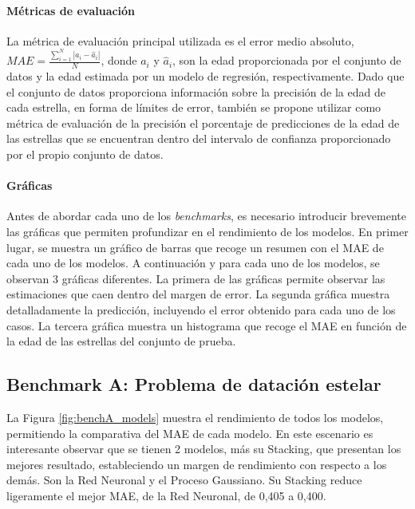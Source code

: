 \paragraph{Métricas de evaluación}
La métrica de evaluación principal utilizada es el error medio absoluto, $MAE = \frac{\sum_{i=1}^{N}|a_i-\hat{a}_i|}{N}$, donde $a_i$ y $\hat{a}_i$, son la edad proporcionada por el conjunto de datos y la edad estimada por un modelo de regresión, respectivamente. Dado que el conjunto de datos proporciona información sobre la precisión de la edad de cada estrella, en forma de límites de error, también se propone utilizar como métrica de evaluación de la precisión el porcentaje de predicciones de la edad de las estrellas que se encuentran dentro del intervalo de confianza proporcionado por el propio conjunto de datos.

\paragraph{Gráficas}
Antes de abordar cada uno de los \emph{benchmarks}, es necesario introducir brevemente las gráficas que permiten profundizar en el rendimiento de los modelos. En primer lugar, se muestra un gráfico de barras que recoge un resumen con el MAE de cada uno de los modelos. A continuación y para cada uno de los modelos, se observan 3 gráficas diferentes. La primera de las gráficas permite observar las estimaciones que caen dentro del margen de error. La segunda gráfica muestra detalladamente la predicción, incluyendo el error obtenido para cada uno de los casos. La tercera gráfica muestra un histograma que recoge el MAE en función de la edad de las estrellas del conjunto de prueba.

\subsection{Benchmark A: Problema de datación estelar}

La Figura \ref{fig:benchA_models} muestra el rendimiento de todos los modelos, permitiendo la comparativa del MAE de cada modelo. En este escenario es interesante observar que se tienen 2 modelos, más su Stacking, que presentan los mejores resultado, estableciendo un margen de rendimiento con respecto a los demás. Son la Red Neuronal y el Proceso Gaussiano. Su Stacking reduce ligeramente el mejor MAE, de la Red Neuronal, de 0,405 a 0,400.

